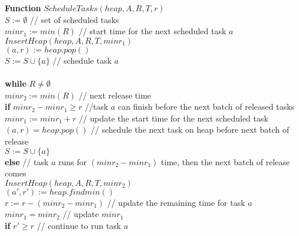 \documentclass[11pt]{article}
\begin{document}
\begin{enumerate}
\begin{enumerate}
\textbf{Function} $ScheduleTasks(heap, A, R, T, r)$\\
\-\hspace{2em} $S := \emptyset$ // set of scheduled tasks\\
\-\hspace{2em} $minr_1 := min(R)$ // start time for the next
scheduled task $a$\\
\-\hspace{2em} $InsertHeap(heap, A, R, T, minr_1)$\\
\-\hspace{2em} $(a,r) := heap.pop()$\\
\-\hspace{2em} $S := S \cup \{a\}$ // schedule task $a$\\\\
\-\hspace{2em} \textbf{while} $R \neq \emptyset$\\
\-\hspace{4em} $minr_2 := min(R)$ // next release time\\
\-\hspace{4em} \textbf{if} $minr_2 - minr_1 \geq r$ //task $a$ can
finish before the next batch of released tasks\\
\-\hspace{6em} $minr_1 := minr_1 + r$ // update the start time for the
next scheduled task\\
\-\hspace{6em} $(a,r) = heap.pop()$ // schedule the next task on heap
before next batch of release \\
\-\hspace{6em} $S := S \cup \{a\}$\\
\-\hspace{4em} \textbf{else} // task $a$ runs for $(minr_2-minr_1)$
time, then the next batch of release comes\\
\-\hspace{6em} $InsertHeap(heap, A, R, T, minr_2)$\\
\-\hspace{6em} $(a',r') := heap.findmin()$\\
\-\hspace{6em} $r := r - (minr_2 - minr_1)$ // update the remaining
time for task $a$\\
\-\hspace{6em} $minr_1 = minr_2$ // update $minr_1$\\
\-\hspace{6em} \textbf{if} $r' \geq r$ // continue to run task $a$\\

\end{enumerate}
\end{enumerate}
\end{document}
